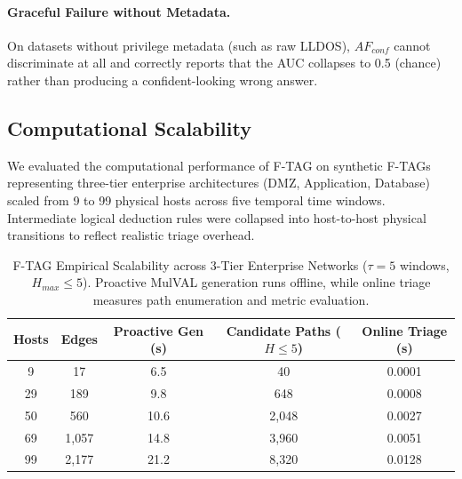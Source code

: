 \documentclass[12pt]{article}
\begin{document}
\paragraph{Graceful Failure without Metadata.}
On datasets without privilege metadata (such as raw LLDOS), $AF_{conf}$ cannot discriminate at all and correctly reports that the AUC collapses to 0.5 (chance) rather than producing a confident-looking wrong answer.

\subsection{Computational Scalability}\label{sec:results-scalability}

We evaluated the computational performance of F-TAG on synthetic F-TAGs representing three-tier enterprise architectures (DMZ, Application, Database) scaled from 9 to 99 physical hosts across five temporal time windows. Intermediate logical deduction rules were collapsed into host-to-host physical transitions to reflect realistic triage overhead.

\begin{table}[t]
\centering
\caption{F-TAG Empirical Scalability across 3-Tier Enterprise Networks ($\tau=5$ windows, $H_{max} \le 5$). Proactive MulVAL generation runs offline, while online triage measures path enumeration and metric evaluation.}
\label{tab:scalability}
\footnotesize
\begin{tabular}{ccccc}
\toprule
\textbf{Hosts} & \textbf{Edges} & \textbf{Proactive Gen (s)} & \textbf{Candidate Paths ($H \le 5$)} & \textbf{Online Triage (s)} \\
\midrule
9     & 17     & 6.5   & 40    & 0.0001 \\
29    & 189    & 9.8   & 648   & 0.0008 \\
50    & 560    & 10.6  & 2,048 & 0.0027 \\
69    & 1,057  & 14.8  & 3,960 & 0.0051 \\
99    & 2,177  & 21.2  & 8,320 & 0.0128 \\
\bottomrule
\end{tabular}
\end{table}
\end{document}
